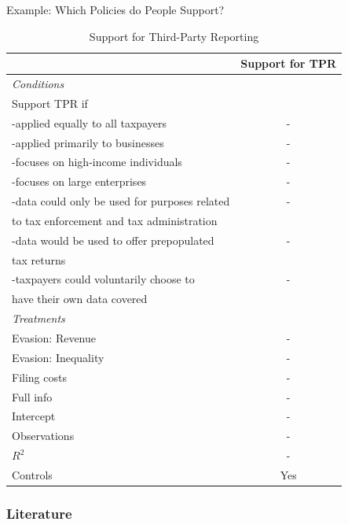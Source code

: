 \documentclass{beamer}
\begin{document}
\begin{frame}{Example: Which Policies do People Support?}
\label{Example:PolicySupport}
\begin{table}[!htbp]\centering
\tiny
\caption{Support for Third-Party Reporting}
\begin{threeparttable}
\begin{tabular}{l|c}
\toprule
 & Support for TPR \\
 \midrule
\textit{Conditions} \\[0.25em]
Support TPR if \\[0.25em]
-applied equally to all taxpayers &-\\[0.25em]
-applied primarily to businesses&-\\[0.25em]
-focuses on high-income individuals &- \\[0.25em]
-focuses on large enterprises&- \\[0.25em]
-data could only be used for purposes related & - \\    to tax enforcement and tax administration\\[0.25em]
-data would be used to offer prepopulated &- \\ tax returns \\[0.25em]
-taxpayers could voluntarily choose to &- \\ have their own data covered\\[1em]
\textit{Treatments} \\
Evasion: Revenue        & - \\
Evasion: Inequality     & - \\
Filing costs            & - \\
Full info               & - \\[0.5em]
\midrule
Intercept &-  \\
Observations                        &-       \\
$R^2$                               &-    \\
Controls                 & Yes      \\
\bottomrule
\end{tabular}
\end{threeparttable}
\end{table} 
\hfill \hyperlink{posttreatment}{}
\end{frame}

\begin{frame}[allowframebreaks]
  \frametitle{Literature}
  \printbibliography
\end{frame}



\end{document}
